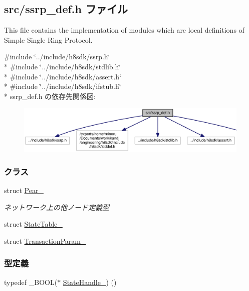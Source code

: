 \subsection{src/ssrp\+\_\+def.h ファイル}
\label{ssrp__def_8h}


This file contains the implementation of modules which are local definitions of Simple Single Ring Protocol.  


{\ttfamily \#include \char`\"{}../include/h8sdk/ssrp.\+h\char`\"{}}\\*
{\ttfamily \#include \char`\"{}../include/h8sdk/stdlib.\+h\char`\"{}}\\*
{\ttfamily \#include \char`\"{}../include/h8sdk/assert.\+h\char`\"{}}\\*
{\ttfamily \#include \char`\"{}../include/h8sdk/ifstub.\+h\char`\"{}}\\*
ssrp\+\_\+def.\+h の依存先関係図\+:\nopagebreak
\begin{figure}[H]
\begin{center}
\leavevmode
\includegraphics[width=350pt]{d2/d75/ssrp__def_8h__incl}
\end{center}
\end{figure}
\subsubsection*{クラス}
\begin{DoxyCompactItemize}
\item 
struct \hyperlink{ssrp__def_8h_d0/de7/structPear__}{Pear\+\_\+}
\begin{DoxyCompactList}\small\item\em ネットワーク上の他ノード定義型 \end{DoxyCompactList}\item 
struct \hyperlink{ssrp__def_8h_d6/d95/structStateTable__}{State\+Table\+\_\+}
\item 
struct \hyperlink{ssrp__def_8h_d4/d30/structTransactionParam__}{Transaction\+Param\+\_\+}
\end{DoxyCompactItemize}
\subsubsection*{型定義}
\begin{DoxyCompactItemize}
\item 
typedef \+\_\+\+B\+O\+O\+L($\ast$ \hyperlink{ssrp__def_8h_ac695a0ebfafafd2768e9c88bfd43f100_ac695a0ebfafafd2768e9c88bfd43f100}{State\+Handle\+\_\+}) ()
\end{DoxyCompactItemize}
